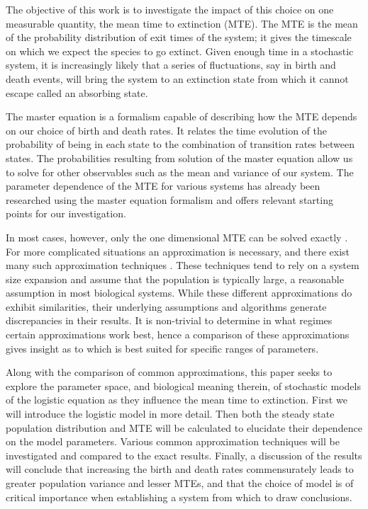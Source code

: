 The objective of this work is to investigate the impact of this choice on one measurable quantity, the mean time to extinction (MTE).
The MTE is the mean of the probability distribution of exit times of the system; it gives the timescale on which we expect the species to go extinct.
Given enough time in a stochastic system, it is increasingly likely that a series of fluctuations, say in birth and death events, will bring the system to an extinction state from which it cannot escape called an absorbing state.

The master equation is a formalism capable of describing how the MTE depends on our choice of birth and death rates.
It relates the time evolution of the probability of being in each state to the combination of transition rates between states.
The probabilities resulting from solution of the master equation allow us to solve for other observables such as the mean and variance of our system.
The parameter dependence of the MTE for various systems has already been researched using the master equation formalism\cite{Nadell1982,others?} and offers relevant starting points for our investigation. 

In most cases, however, only the one dimensional MTE can be solved exactly \cite{?}.
For more complicated situations an approximation is necessary, and there exist many such approximation techniques \cite{}.
These techniques tend to rely on a system size expansion and assume that the population is typically large, a reasonable assumption in most biological systems. 
While these different approximations do exhibit similarities, their underlying assumptions and algorithms generate discrepancies in their results. 
It is non-trivial to determine in what regimes certain approximations work best, hence a comparison of these approximations gives insight as to which is best suited for specific ranges of parameters. 

Along with the comparison of common approximations, this paper seeks to explore the parameter space, and biological meaning therein, of stochastic models of the logistic equation as they influence the mean time to extinction. 
First we will introduce the logistic model in more detail.
Then both the steady state population distribution and MTE will be calculated to elucidate their dependence on the model parameters. 
Various common approximation techniques will be investigated and compared to the exact results. 
Finally, a discussion of the results will conclude that increasing the birth and death rates commensurately leads to greater population variance and lesser MTEs, and that the choice of model is of critical importance when establishing a system from which to draw conclusions.

